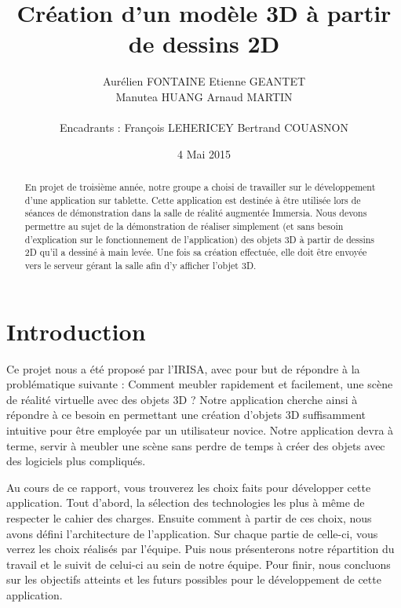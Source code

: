 \documentclass[a4paper,11pt]{article}
\title{ \textbf{Création d'un modèle 3D à partir de dessins 2D} }
\author{ Aurélien \textsc{FONTAINE} Etienne \textsc{GEANTET} \\
	Manutea \textsc{HUANG} Arnaud \textsc{MARTIN} \\
	\\
	Encadrants : François \textsc{LEHERICEY}	Bertrand \textsc{COUASNON}}
\date{4 Mai 2015}                    %
\begin{document}
\maketitle                 %
\thispagestyle{empty}      %

\begin{abstract}
	En projet de troisième année, notre groupe a choisi de travailler sur le développement d'une application sur tablette. Cette application est destinée à être utilisée lors de séances de démonstration dans la salle de réalité augmentée Immersia. Nous devons permettre au sujet de la démonstration de réaliser simplement (et sans besoin d'explication sur le fonctionnement de l'application) des objets 3D à partir de dessins 2D qu'il a dessiné à main levée. Une fois sa création effectuée, elle doit être envoyée vers le serveur gérant la salle afin d'y afficher l'objet 3D.
\end{abstract}
	
	\section{Introduction} %
		Ce projet nous a été proposé par l'IRISA, avec pour but de répondre à la problématique suivante : Comment meubler rapidement et facilement, une scène de réalité virtuelle avec des objets 3D ? Notre application cherche ainsi à répondre à ce besoin en permettant une création d'objets 3D suffisamment intuitive pour être employée par un utilisateur novice. Notre application devra à terme, servir à meubler une scène sans perdre de temps à créer des objets avec des logiciels plus compliqués.
		
		Au cours de ce rapport, vous trouverez les choix faits pour développer cette application. Tout d'abord, la sélection des technologies les plus à même de respecter le cahier des charges. Ensuite comment à partir de ces choix, nous avons défini l'architecture de l'application. Sur chaque partie de celle-ci, vous verrez les choix réalisés par l'équipe. Puis nous présenterons notre répartition du travail et le suivit de celui-ci au sein de notre équipe. Pour finir, nous concluons sur les objectifs atteints et les futurs possibles pour le développement de cette application.
\end{document}
